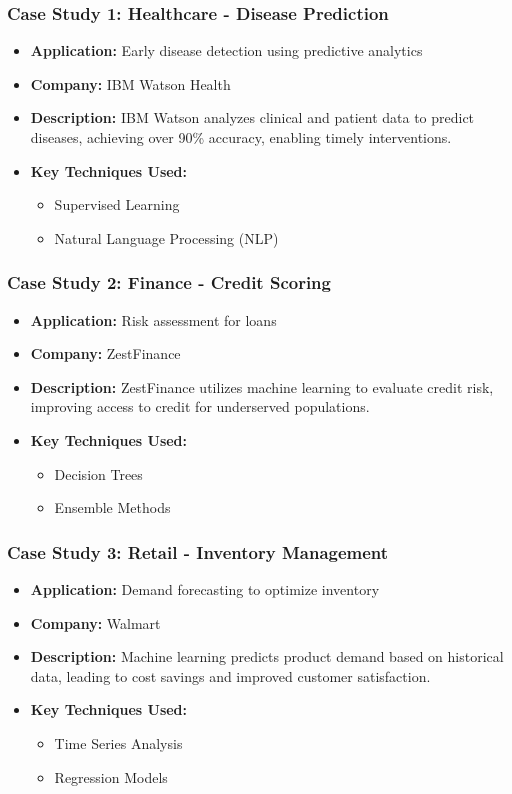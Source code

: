 \documentclass[aspectratio=169]{beamer}
\begin{document}
\begin{frame}[fragile]
    \frametitle{Case Study 1: Healthcare - Disease Prediction}
    \begin{itemize}
        \item \textbf{Application:} Early disease detection using predictive analytics
        \item \textbf{Company:} IBM Watson Health
        \item \textbf{Description:} 
        IBM Watson analyzes clinical and patient data to predict diseases, achieving over 90\% accuracy, enabling timely interventions.
        \item \textbf{Key Techniques Used:}
            \begin{itemize}
                \item Supervised Learning
                \item Natural Language Processing (NLP)
            \end{itemize}
    \end{itemize}
\end{frame}

\begin{frame}[fragile]
    \frametitle{Case Study 2: Finance - Credit Scoring}
    \begin{itemize}
        \item \textbf{Application:} Risk assessment for loans
        \item \textbf{Company:} ZestFinance
        \item \textbf{Description:} 
        ZestFinance utilizes machine learning to evaluate credit risk, improving access to credit for underserved populations.
        \item \textbf{Key Techniques Used:}
            \begin{itemize}
                \item Decision Trees
                \item Ensemble Methods
            \end{itemize}
    \end{itemize}
\end{frame}

\begin{frame}[fragile]
    \frametitle{Case Study 3: Retail - Inventory Management}
    \begin{itemize}
        \item \textbf{Application:} Demand forecasting to optimize inventory
        \item \textbf{Company:} Walmart
        \item \textbf{Description:} 
        Machine learning predicts product demand based on historical data, leading to cost savings and improved customer satisfaction.
        \item \textbf{Key Techniques Used:}
            \begin{itemize}
                \item Time Series Analysis
                \item Regression Models
            \end{itemize}
    \end{itemize}
\end{frame}
\end{document}
